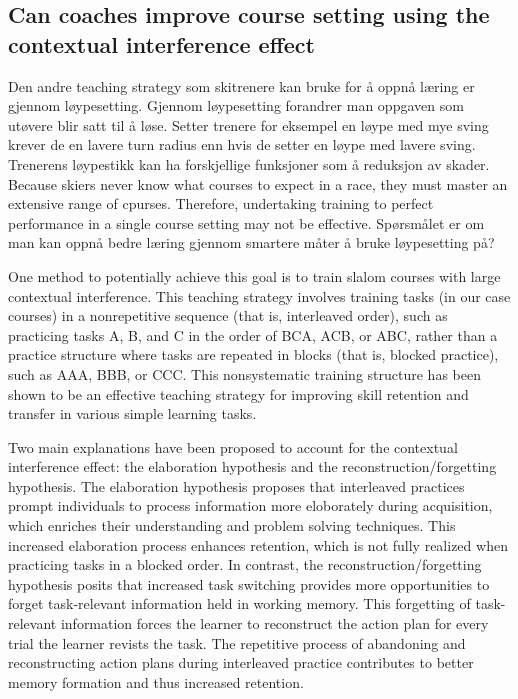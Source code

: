 \subsection{Can coaches improve course setting using the contextual interference effect}
Den andre teaching strategy som skitrenere kan bruke for å oppnå læring er gjennom løypesetting. Gjennom løypesetting forandrer man oppgaven som utøvere blir satt til å løse. Setter trenere for eksempel en løype med mye sving krever de en lavere turn radius enn hvis de setter en løype med lavere sving. Trenerens løypestikk kan ha forskjellige funksjoner som å reduksjon av skader. Because skiers never know what courses to expect in a race, they must master an extensive range of cpurses. Therefore, undertaking training to perfect performance in a single course setting may not be effective. Spørsmålet er om man kan oppnå bedre læring gjennom smartere måter å bruke løypesetting på?

One method to potentially achieve this goal is to train slalom courses with large contextual interference. This teaching strategy involves training tasks (in our case courses) in a nonrepetitive sequence (that is, interleaved order), such as practicing tasks A, B, and C in the order of BCA, ACB, or ABC, rather than a practice structure where tasks are repeated in blocks (that is, blocked practice), such as AAA, BBB, or CCC. This nonsystematic training structure has been shown to be an effective teaching strategy for improving skill retention and transfer in various simple learning tasks.

Two main explanations have been proposed to account for the contextual interference effect: the elaboration hypothesis and the reconstruction/forgetting hypothesis. The elaboration hypothesis proposes that interleaved practices prompt individuals to process information more eloborately during acquisition, which enriches their understanding and problem solving techniques. This increased elaboration process enhances retention, which is not fully realized when practicing tasks in a blocked order. In contrast, the reconstruction/forgetting hypothesis posits that increased task switching provides more opportunities to forget task-relevant information held in working memory. This forgetting of task-relevant information forces the learner to reconstruct the action plan for every trial the learner revists the task. The repetitive process of abandoning and reconstructing action plans during interleaved practice contributes to better memory formation and thus increased retention.

